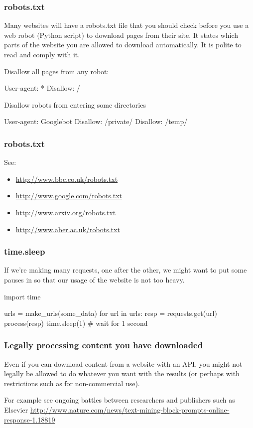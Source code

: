 \documentclass{beamer}
\begin{document}
\begin{frame}[fragile]
\frametitle{robots.txt}
Many websites will have a robots.txt file that you should check before you use a web robot (Python script) to download pages from their site. It states which parts of the website you are allowed to download automatically. It is polite to read and comply with it.

\bigskip

Disallow all pages from any robot:
\begin{code}
User-agent: *
Disallow: /
\end{code}

Disallow robots from entering some directories
\begin{code}
User-agent: Googlebot
Disallow: /private/
Disallow: /temp/
\end{code}
\end{frame}

\begin{frame}[fragile]
\frametitle{robots.txt}
See: 
\begin{itemize}
\item \url{http://www.bbc.co.uk/robots.txt} 
\item \url{http://www.google.com/robots.txt}
\item \url{http://www.arxiv.org/robots.txt}
\item \url{http://www.aber.ac.uk/robots.txt}
\end{itemize}
\end{frame}

\begin{frame}[fragile]
\frametitle{time.sleep}
If we're making many requests, one after the other, we might want to put some pauses in so that our usage of the website is not too heavy.
\begin{code}
import time

urls = make_urls(some_data)
for url in urls:
   resp = requests.get(url)
   process(resp)
   time.sleep(1) # wait for 1 second
\end{code}
\end{frame}


\begin{frame}[fragile]
\frametitle{Legally processing content you have downloaded}
Even if you can download content from a website with an API, you might not legally be allowed to do whatever you want with the results (or perhaps with restrictions such as for non-commercial use).

\bigskip

For example see ongoing battles between researchers and publishers such as Elsevier \url{http://www.nature.com/news/text-mining-block-prompts-online-response-1.18819}
\end{frame}
\end{document}
